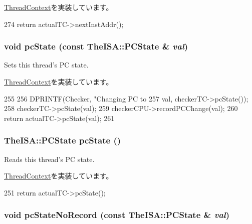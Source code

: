 \hyperlink{classThreadContext_a01377ccfda419abf5f6ff7730c9eaac9}{ThreadContext}を実装しています。


\begin{DoxyCode}
274     { return actualTC->nextInstAddr(); }
\end{DoxyCode}
\hypertarget{classCheckerThreadContext_a5e9cfc754c9ef9b7db875ce89871944e}{
\subsubsection[{pcState}]{\setlength{\rightskip}{0pt plus 5cm}void pcState (const TheISA::PCState \& {\em val})}}
\label{classCheckerThreadContext_a5e9cfc754c9ef9b7db875ce89871944e}
Sets this thread's PC state. 

\hyperlink{classThreadContext_a8f9949be84d3a2db4137f9e49ce32952}{ThreadContext}を実装しています。


\begin{DoxyCode}
255     {
256         DPRINTF(Checker, "Changing PC to %
257                          val, checkerTC->pcState());
258         checkerTC->pcState(val);
259         checkerCPU->recordPCChange(val);
260         return actualTC->pcState(val);
261     }
\end{DoxyCode}
\hypertarget{classCheckerThreadContext_a827fb3454585cf4c620f4fd341966317}{
\subsubsection[{pcState}]{\setlength{\rightskip}{0pt plus 5cm}TheISA::PCState pcState ()}}
\label{classCheckerThreadContext_a827fb3454585cf4c620f4fd341966317}
Reads this thread's PC state. 

\hyperlink{classThreadContext_a1aaca26c0732d2191edbde1477d7ec13}{ThreadContext}を実装しています。


\begin{DoxyCode}
251     { return actualTC->pcState(); }
\end{DoxyCode}
\hypertarget{classCheckerThreadContext_a6005386aeeaecb35499c3199fb47ba2f}{
\subsubsection[{pcStateNoRecord}]{\setlength{\rightskip}{0pt plus 5cm}void pcStateNoRecord (const TheISA::PCState \& {\em val})}}
\label{classCheckerThreadContext_a6005386aeeaecb35499c3199fb47ba2f}


